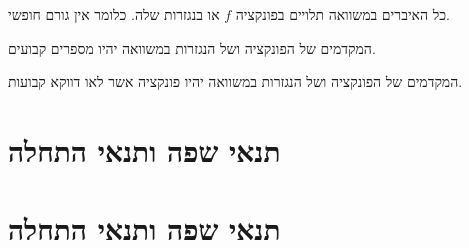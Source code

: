 \documentclass{tstextbook}
\begin{document}
\begin{definition}[מד"ח הומוגני]
כל האיברים במשוואה תלויים בפונקציה \(f\) או בנגזרות שלה. כלומר אין גורם חופשי.

\end{definition}
\begin{definition}
המקדמים של הפונקציה ושל הנגזרות במשוואה יהיו מספרים קבועים.

\end{definition}
\begin{definition}
המקדמים של הפונקציה ושל הנגזרות במשוואה יהיו פונקציה אשר לאו דווקא קבועות.

\end{definition}
\section{תנאי שפה ותנאי התחלה}

\section{תנאי שפה ותנאי התחלה}
\end{document}
